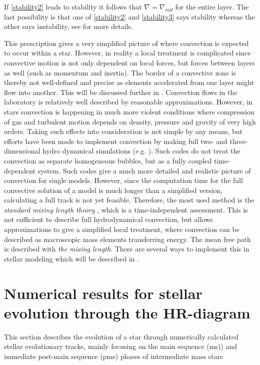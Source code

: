 If \eqref{stability2} leads to stability it follows that $\nabla = \nabla_{rad}$ for the entire layer. The  last possibility is that one of \eqref{stability2} and \eqref{stability3} says stability whereas the other says instability, see \citep{kippenhahn1990stellar} for more details.
 
This prescription gives a very simplified picture of where convection is expected to occur within a star. However, in reality a local treatment is complicated since convective motion is not only dependent on local forces, but forces between layers as well (such as momentum and inertia). The border of a convective zone is thereby not well-defined and precise as elements accelerated from one layer might flow into another. This will be discussed further in . 
Convection flows in the laboratory is relatively well described by reasonable approximations. However, in stars convection is happening in much more violent conditions where compression of gas and turbulent motion depends on density, pressure and gravity of very high orders.  Taking such effects into consideration is not simple by any means, but efforts have been made to implement convection by making full two- and three-dimensional hydro dynamical simulations (e.g. \citet{nordlund19903}). Such codes do not treat the convection as separate homogeneous bubbles, but as a fully coupled time-dependent system. Such codes give a much more detailed and realistic picture of convection for single models. However, since the computation time for the full convective solution of a model is much longer than a simplified version, calculating a full track is not yet feasible. Therefore, the most used method is the \textit{standard mixing length theory} \citep{weiss2004cox}, which is a time-independent assessment. This is not sufficient to describe full hydrodynamical convection, but allows approximations to give a simplified local treatment, where convection can be described as macroscopic mass elements transferring energy. The mean free path is described with \textit{the mixing length}. There are several ways to implement this in stellar modeling which will be described in . 


\section[Stellar evolution through the HR-diagram]{Numerical results for stellar evolution through the HR-diagram}
This section describes the evolution of a star through numerically calculated stellar evolutionary tracks, mainly focusing on the main sequence (ms)) and immediate post-main sequence (pms) phases of intermediate mass stars


